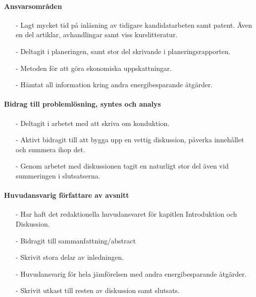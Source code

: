 \documentclass[12pt,a4paper]{article}
\begin{document}
\paragraph{Ansvarsområden}

\begin{itemize}
\item[-] Lagt mycket tid på inläsning av tidigare kandidatarbeten samt patent. Även en del artiklar, avhandlingar samt viss kurslitteratur. 
\item[-] Deltagit i planeringen, samt stor del skrivande i planeringsrapporten.
\item[-] Metoden för att göra ekonomiska uppskattningar.
\item[-] Hämtat all information kring andra energibesparande åtgärder. 
\end{itemize}


\paragraph{Bidrag till problemlösning, syntes och analys}

\begin{itemize}
\item[-] Deltagit i arbetet med att skriva om konduktion.
\item[-] Aktivt bidragit till att bygga upp en vettig diskussion, påverka innehållet och summera ihop det.
\item[-] Genom arbetet med diskussionen tagit en naturligt stor del även vid summeringen i slutsatserna.
\end{itemize}


\paragraph{Huvudansvarig författare av avsnitt}

\begin{itemize}
\item[-] Har haft det redaktionella huvudansvaret för kapitlen Introduktion och Diskussion.
\item[-] Bidragit till sammanfattning/abstract
\item[-] Skrivit stora delar av inledningen.
\item[-] Huvudansvarig för hela jämförelsen med andra energibesparande åtgärder.
\item[-] Skrivit utkast till resten av diskussion samt slutsats.
\end{itemize}
\end{document}
